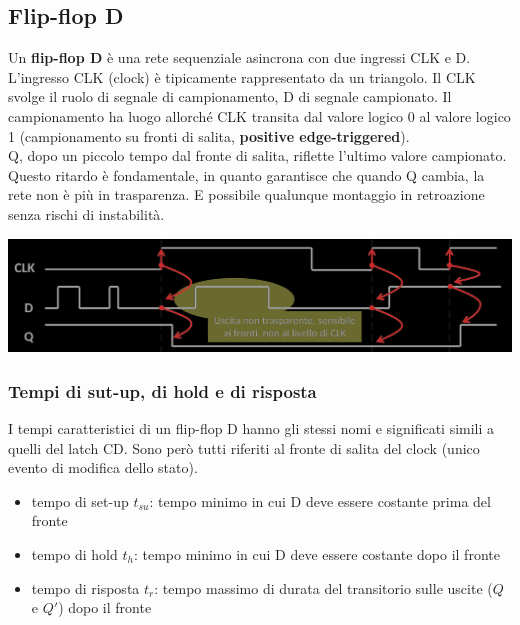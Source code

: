 \documentclass{article}
\begin{document}
\subsection{Flip-flop D}
Un \textbf{\color{blue} flip-flop D} è una rete sequenziale asincrona con due ingressi CLK e D. L’ingresso CLK (clock) è tipicamente rappresentato da un triangolo. Il CLK svolge il ruolo di segnale di campionamento, D di segnale campionato. Il campionamento ha luogo allorché CLK transita dal valore logico 0 al valore logico 1 (campionamento su fronti di salita, \textbf{\color{cyan} positive edge-triggered}).\\
Q, dopo un piccolo tempo dal fronte di salita, riflette l’ultimo valore campionato. Questo ritardo è fondamentale, in quanto garantisce che quando Q cambia, la rete non è più in trasparenza. E possibile qualunque montaggio in retroazione senza rischi di instabilità.
\begin{center}
    \includegraphics[scale=0.35]{flip-flop D-grafico.png}
\end{center}



\subsubsection{Tempi di sut-up, di hold e di risposta}
I tempi caratteristici di un flip-flop D hanno gli stessi nomi e significati simili a quelli del latch CD. Sono però tutti riferiti al fronte di salita del clock (unico evento di modifica dello stato).
\begin{itemize}
    \item tempo di set-up $t_{su}$: tempo minimo in cui D deve essere costante prima del fronte
    \item tempo di hold $t_h$: tempo minimo in cui D deve essere costante dopo il fronte
    \item tempo di risposta $t_r$: tempo massimo di durata del transitorio sulle uscite ($Q$ e $Q'$) dopo il fronte
\end{itemize}
\end{document}
